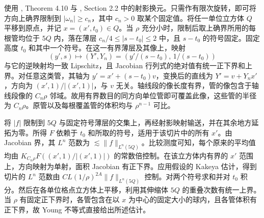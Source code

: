 使用 \cite{r-75}, Theorem 4.10 与 \cite{r-30}, Section 2.2 中的射影换元。只需作有限次旋转，即可将方向上确界限制到 \(|\omega_n|\ge c_n\)，其中 \(c_n>0\) 取某个固定值。将任一单位立方体 \(Q\) 平移到原点，并记 \(x=(x',t_0)\in Q\)。当 \(\rho\) 充分小时，限制后取上确界所用的每根管均位于 \(5Q\) 内，落在薄层 \(c_n/4\le |s-t_0|\le2\) 中，且 \(s-t_0\) 的符号固定。固定高度 \(t_0\) 和其中一个符号。在这一有界薄层及其像上，映射
\[
 (y',s)\longmapsto (Y',Y_n)=\left(y'/(s-t_0),\,1/(s-t_0)\right)
\]
与它的逆映射均一致 Lipschitz，且 Jacobian 行列式的绝对值有统一正下界和上界。对任意这类管，其轴为 \(y'=x'+(s-t_0)v\)，变换后的直线为 \(Y'=v+Y_nx'\)，方向为 \((x',1)/|(x',1)|\)，与 \(v\) 无关。轴线段的像长度有界，管的像包含于轴线段像的 \(C_n\rho\) 邻域。故用有界数目的同方向单位管即可覆盖此像，这些管的半径为 \(C_n\rho\)。原管以及每根覆盖管的体积均与 \(\rho^{n-1}\) 可比。

将 \(|f|\) 限制到 \(5Q\) 与固定符号薄层的交集上，再经射影映射输送，并在其余地方延拓为零。所得 \(F\) 依赖于 \(t_0\) 和所取的符号，适用于该切片中的所有 \(x'\)。由 Jacobian 界，其 \(L^n\) 范数为 \(\lesssim\|f\|_{L^n(5Q)}\)。比较测度可知，每个原来的平均值均由 \(K_{C_n\rho}F((x',1)/|(x',1)|)\) 的常数倍控制。在该立方体内有界的 \(x'\) 范围上，方向映射为单射，面积 Jacobian 有正下界。应用假设的 Kakeya 估计，得到切片的 \(L^n\) 范数由 \(C L(1/\rho)^{2A}\|f\|_{L^n(5Q)}\) 控制。对两个符号求和并对 \(t_0\) 积分。然后在各单位格点立方体上平移，利用其伸缩体 \(5Q\) 的重叠次数有统一上界。当 \(\rho\) 有固定正下界时，各管包含在以 \(x\) 为中心的固定大小的球内，且各管体积有正下界，故 Young 不等式直接给出所述估计。
